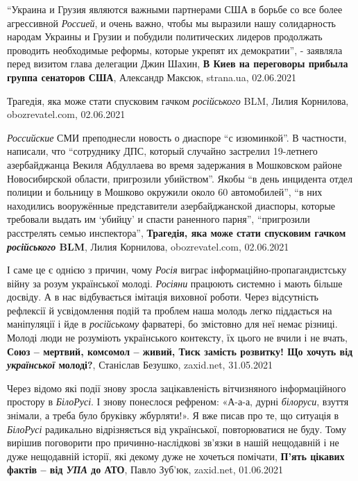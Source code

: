 \enquote{Украина и Грузия являются важными партнерами США в борьбе со все более
агрессивной \emph{Россией}, и очень важно, чтобы мы выразили нашу солидарность народам
Украины и Грузии и побудили политических лидеров продолжать проводить
необходимые реформы, которые укрепят их демократии}, - заявляла перед визитом
глава делегации Джин Шахин,
\textbf{В Киев на переговоры прибыла группа сенаторов США}, Александр Максюк, strana.ua, 02.06.2021

Трагедія, яка може стати спусковим гачком \emph{російського} BLM, Лилия Корнилова, obozrevatel.com, 02.06.2021

\emph{Российские} СМИ преподнесли новость о диаспоре \enquote{с изюминкой}. В
частности, написали, что \enquote{сотруднику ДПС, который случайно застрелил
19-летнего азербайджанца Векиля Абдуллаева во время задержания в Мошковском
районе Новосибирской области, пригрозили убийством}.  Якобы \enquote{в день
инцидента отдел полиции и больницу в Мошково окружили около 60 автомобилей},
\enquote{в них находились вооружённые представители азербайджанской диаспоры,
которые требовали выдать им \enquote{убийцу} и спасти раненного парня},
\enquote{пригрозили расстрелять семью инспектора},
\textbf{Трагедія, яка може стати спусковим гачком \emph{російського} BLM}, Лилия Корнилова, obozrevatel.com, 02.06.2021

І саме це є однією з причин, чому \emph{Росія} виграє інформаційно-пропагандистську
війну за розум української молоді. \emph{Росіяни} працюють системно і мають більше
досвіду. А в нас відбувається імітація виховної роботи. Через відсутність
рефлексії й усвідомлення подій та проблем наша молодь легко піддається на
маніпуляції і йде в \emph{російському} фарватері, бо змістовно для неї немає різниці.
Молоді люди не розуміють українського контексту, їх цього не вчили і не вчать,
\textbf{Союз – мертвий, комсомол – живий, Тиск замість розвитку! Що хочуть від \emph{української} молоді?},
Станіслав Безушко, zaxid.net, 31.05.2021

Через відомо які події знову зросла зацікавленість вітчизняного інформаційного
простору в \emph{БілоРусі}. І знову понеслося рефреном: «А-а-а, дурні
\emph{білоруси}, взуття знімали, а треба було бруківку жбурляти!». Я вже писав
про те, що ситуація в \emph{БілоРусі} радикально відрізняється від української,
повторюватися не буду. Тому вирішив поговорити про причинно-наслідкові зв'язки
в нашій нещодавній і не дуже нещодавній історії, які декому дуже не хочеться
помічати, 
\textbf{П'ять цікавих фактів – від \emph{УПА} до АТО}, Павло Зуб'юк, zaxid.net, 01.06.2021


